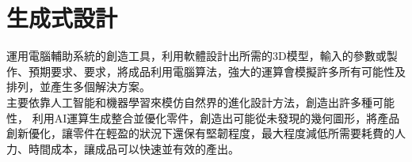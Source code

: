 \chapter{生成式設計}
運用電腦輔助系統的創造工具，利用軟體設計出所需的3D模型，輸入的參數或製作、預期要求、要求，將成品利用電腦算法，強大的運算會模擬許多所有可能性及排列，並產生多個解決方案。\\
主要依靠人工智能和機器學習來模仿自然界的進化設計方法，創造出許多種可能性，
利用AI運算生成整合並優化零件，創造出可能從未發現的幾何圖形，將產品創新優化，讓零件在輕盈的狀況下還保有堅韌程度，最大程度減低所需要耗費的人力、時間成本，讓成品可以快速並有效的產出。\\

